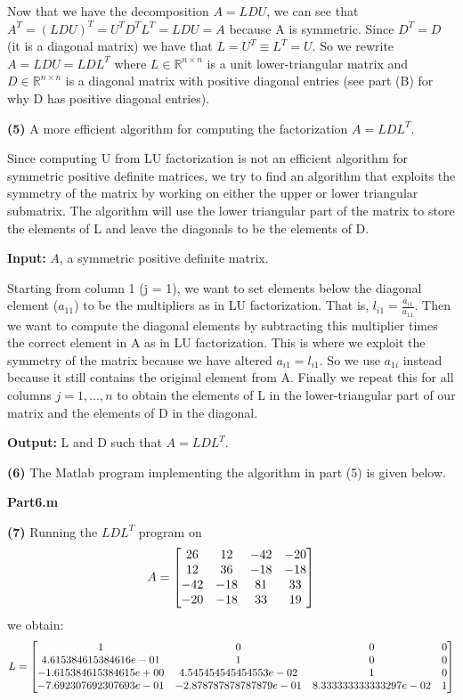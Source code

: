 \documentclass[final,12pt,reqno]{amsart}
\begin{document}
Now that we have the decomposition $A = LDU$, we can see that $A^T = (LDU)^T = U^TD^TL^T = LDU = A$ because A is symmetric. Since $D^T = D$ (it is a diagonal matrix) we have that $L = U^T \equiv L^T = U$. So we rewrite $A = LDU = LDL^T$ where $L \in \mathbb{R}^{n\times n}$ is a unit lower-triangular matrix and $D \in \mathbb{R}^{n\times n}$ is a diagonal matrix with positive diagonal entries (see part (B) for why D has positive diagonal entries).

\newpage

\textbf{(5)} A more efficient algorithm for computing the factorization $A = LDL^T$.

Since computing U from LU factorization is not an efficient algorithm for symmetric positive definite matrices, we try to find an algorithm that exploits the symmetry of the matrix by working on either the upper or lower triangular submatrix. The algorithm will use the lower triangular part of the matrix to store the elements of L and leave the diagonals to be the elements of D.

\textbf{Input:} $A$, a symmetric positive definite matrix.

Starting from column 1 (j = 1), we want to set elements below the diagonal element ($a_{11}$) to be the multipliers as in LU factorization. That is, $l_{i1} = \frac{a_{i1}}{a_{11}}$. Then we want to compute the diagonal elements by subtracting this multiplier times the correct element in A as in LU factorization. This is where we exploit the symmetry of the matrix because we have altered $a_{i1} = l_{i1}$. So we use $a_{1i}$ instead because it still contains the original element from A. Finally we repeat this for all columns $j = 1,...,n$ to obtain the elements of L in the lower-triangular part of our matrix and the elements of D in the diagonal.

\textbf{Output:} L and D such that $A = LDL^T$.

\textbf{(6)} The Matlab program implementing the algorithm in part (5) is given below.

\textbf{Part6.m}


\newpage

\textbf{(7)} Running the $LDL^T$ program on
\[
A =
\left[\begin{array}{@{}*{4}{c}@{}}
  26 & 12 & -42 & -20\\
	12 & 36 & -18 & -18\\
	-42 & -18 & 81 & 33\\
	-20 & -18 & 33 & 19
  \end{array} \right]
\]
we obtain:
\[
L =
\left[\begin{array}{@{}*{4}{c}@{}}
  1 & 0 & 0 & 0\\
	4.615384615384616e-01 & 1 & 0 & 0\\
	-1.615384615384615e+00 & 4.545454545454553e-02 & 1 & 0\\
	-7.692307692307693e-01 & -2.878787878787879e-01 & 8.333333333333297e-02 & 1
  \end{array} \right]
\]
\end{document}
